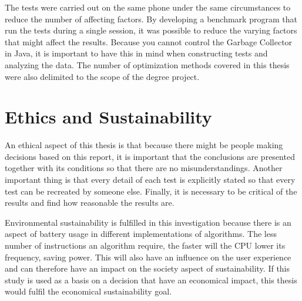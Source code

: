 The tests were carried out on the same phone under the same circumstances to reduce the number of affecting factors. By developing a benchmark program that run the tests during a single session, it was possible to reduce the varying factors that might affect the results. Because you cannot control the Garbage Collector in Java, it is important to have this in mind when constructing tests and analyzing the data. The number of optimization methods covered in this thesis were also delimited to the scope of the degree project.

\section{Ethics and Sustainability}
An ethical aspect of this thesis is that because there might be people making decisions based on this report, it is important that the conclusions are presented together with its conditions so that there are no misunderstandings. Another important thing is that every detail of each test is explicitly stated so that every test can be recreated by someone else. Finally, it is necessary to be critical of the results and find how reasonable the results are.

Environmental sustainability is fulfilled in this investigation because there is an aspect of battery usage in different implementations of algorithms. The less number of instructions an algorithm require, the faster will the CPU lower its frequency, saving power. This will also have an influence on the user experience and can therefore have an impact on the society aspect of sustainability. If this study is used as a basis on a decision that have an economical impact, this thesis would fulfil the economical sustainability goal.

